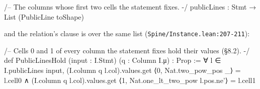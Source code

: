 \begin{leancode}
  /-- The columns whose first two cells the statement fixes. -/
  publicLines : Stmt → List (PublicLine toShape)
\end{leancode}

and the relation's clause is over the same list (\texttt{Spine/\allowbreak{}Instance.\allowbreak{}lean:207-{}211}):

\begin{leancode}
/-- Cells 0 and 1 of every column the statement fixes hold their values (§8.2). -/
def PublicLinesHold (input : I.Stmt) (q : Column I.μ) : Prop :=
  ∀ l ∈ I.publicLines input,
    (I.column q l.col).values.get ⟨0, Nat.two_pow_pos _⟩ = l.cell0 ∧
      (I.column q l.col).values.get ⟨1, Nat.one_lt_two_pow l.pos.ne'⟩ = l.cell1
\end{leancode}

